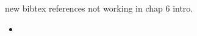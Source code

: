 \documentclass{report}
\begin{document}
\begin{itemise}   
\item new bibtex references not working in chap 6 intro.
\item 

\end{itemise}


\begin{itemize}
  \item 
\end{itemize}
\end{document}
